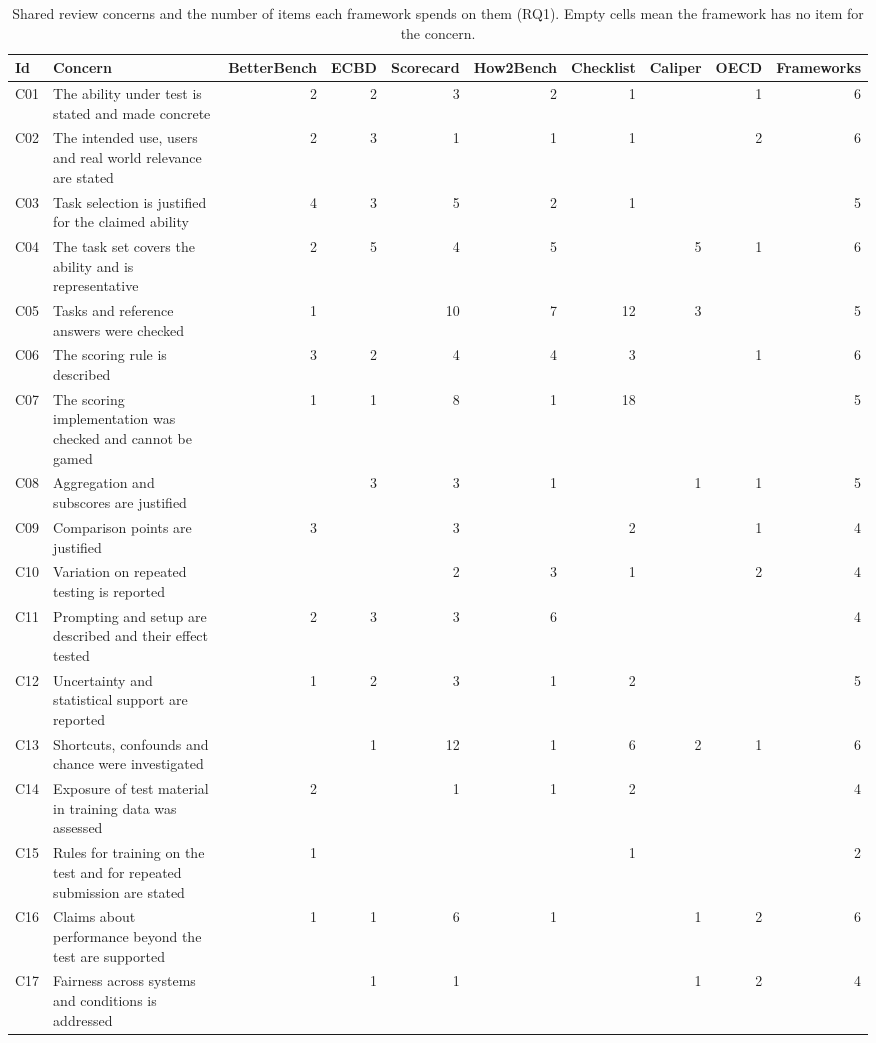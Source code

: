 \begin{table}[t]
\caption{Shared review concerns and the number of items each framework spends on them (RQ1). Empty cells mean the framework has no item for the concern.}
\label{tab:coverage}
\small
\begin{tabular}{@{}llrrrrrrrr@{}}
\toprule
Id & Concern & BetterBench & ECBD & Scorecard & How2Bench & Checklist & Caliper & OECD & Frameworks \\
\midrule
C01 & The ability under test is stated and made concrete & 2 & 2 & 3 & 2 & 1 &  & 1 & 6 \\
C02 & The intended use, users and real world relevance are stated & 2 & 3 & 1 & 1 & 1 &  & 2 & 6 \\
C03 & Task selection is justified for the claimed ability & 4 & 3 & 5 & 2 & 1 &  &  & 5 \\
C04 & The task set covers the ability and is representative & 2 & 5 & 4 & 5 &  & 5 & 1 & 6 \\
C05 & Tasks and reference answers were checked & 1 &  & 10 & 7 & 12 & 3 &  & 5 \\
C06 & The scoring rule is described & 3 & 2 & 4 & 4 & 3 &  & 1 & 6 \\
C07 & The scoring implementation was checked and cannot be gamed & 1 & 1 & 8 & 1 & 18 &  &  & 5 \\
C08 & Aggregation and subscores are justified &  & 3 & 3 & 1 &  & 1 & 1 & 5 \\
C09 & Comparison points are justified & 3 &  & 3 &  & 2 &  & 1 & 4 \\
C10 & Variation on repeated testing is reported &  &  & 2 & 3 & 1 &  & 2 & 4 \\
C11 & Prompting and setup are described and their effect tested & 2 & 3 & 3 & 6 &  &  &  & 4 \\
C12 & Uncertainty and statistical support are reported & 1 & 2 & 3 & 1 & 2 &  &  & 5 \\
C13 & Shortcuts, confounds and chance were investigated &  & 1 & 12 & 1 & 6 & 2 & 1 & 6 \\
C14 & Exposure of test material in training data was assessed & 2 &  & 1 & 1 & 2 &  &  & 4 \\
C15 & Rules for training on the test and for repeated submission are stated & 1 &  &  &  & 1 &  &  & 2 \\
C16 & Claims about performance beyond the test are supported & 1 & 1 & 6 & 1 &  & 1 & 2 & 6 \\
C17 & Fairness across systems and conditions is addressed &  & 1 & 1 &  &  & 1 & 2 & 4 \\

\end{tabular}
\end{table}

